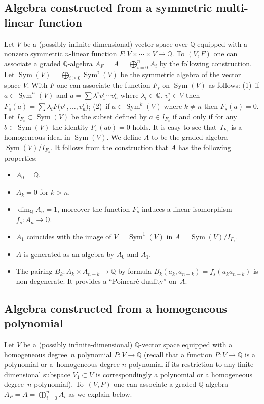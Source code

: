\documentclass[pdftex]{sigma}
\def \Q{\mathbb{Q}}
\def \Sym{\operatorname{Sym}}
\numberwithin{equation}{section}
\theoremstyle{definition}
\begin{document}
\subsection{Algebra constructed from a symmetric multi-linear function} Let $V$ be a (possibly infinite-dimensional)
vector space over $\Q$ equipped with a nonzero symmetric $n$-linear function $F\colon V \times \cdots \times V \to \Q$. To $(V, F)$ one can associate a graded $\Q$-algebra $A _F= A = \bigoplus_{i=0}^n A_i$ by the following construction. Let $\Sym(V)= \bigoplus_{i \geq 0} \Sym^i(V)$ be the symmetric algebra of the vector space $V$. With $F$ one can associate the function $F_s$ on $\Sym(V)$ as follows: (1)~if $a\in \Sym^n(V)$ and $a=\sum \lambda^iv_1^i\cdots v^i_n$ where $\lambda_i\in \Q$, $v^i_j\in V$ then $F_s(a)=\sum\lambda_i F\big(v_1^i, \ldots, v^i_n\big)$; (2)~if $a\in \Sym^k(V)$ where $k \neq n$ then $F_s(a)=0$. Let $I_{F_s}\subset \Sym(V)$ be the subset defined by $a\in I_{F_s}$ if and only if for any $b\in \Sym(V)$ the identity $F_s(ab)=0$ holds. It is easy to see that~$I_{F_s}$ is a homogeneous ideal in $\Sym(V)$. We define $A$ to be the graded algebra $\Sym(V) / I_{F_s}$. It follows from the construction that $A$ has the following properties:
\begin{itemize}\itemsep=0pt
\item $A_0=\Q$.
\item $A_k=0$ for $k>n$.
\item $\dim _{\Q}A_n=1$, moreover the function $F_s$ induces a linear isomorphism $f_s\colon A_n \rightarrow \Q$.
\item $A_1$ coincides with the image of $V=\Sym^1(V)$ in $A=\Sym(V)/I_{F_s}$.
\item $A$ is generated as an algebra by $A_0$ and $A_1$.
\item The pairing $B_k\colon A_k\times A_{n-k}\rightarrow \Q$ by formula $B_k(a_k, a_{n-k})=f_s(a_k a_{n-k})$ is non-degenerate. It provides a ``Poincar\'e duality'' on~$A$.
\end{itemize}

\subsection{Algebra constructed from a homogeneous polynomial}
Let $V$ be a (possibly infinite-dimensional) $\Q$-vector space equipped with a homogeneous deg\-ree~$n$ polynomial $P\colon V \to \Q$ (recall that a function $P\colon V \to \Q$ is a polynomial or a~homogeneous degree $n$ polynomial if its restriction to any finite-dimensional subspace $V_1\subset V$ is correspondingly a polynomial or a homogeneous degree~$n$ polynomial). To~$(V, P)$ one can associate a graded $\Q$-algebra $A_P = A = \bigoplus_{i=0}^n A_i$ as we explain below.
\end{document}
